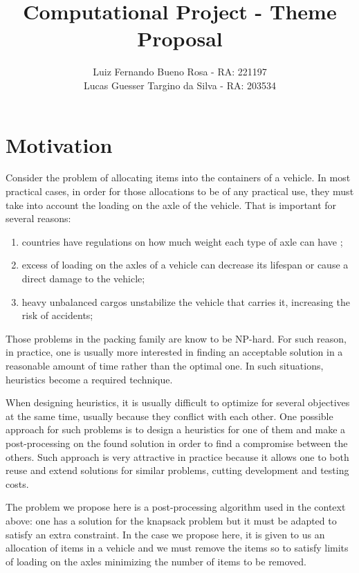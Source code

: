 \documentclass{article}
\title{Computational Project - Theme Proposal}
\author{
	Luiz Fernando Bueno Rosa - RA: 221197 \\
	Lucas Guesser Targino da Silva - RA: 203534
}
\newcommand{\nphard}{NP-hard\xspace}
\begin{document}
\maketitle

\section{Motivation}

Consider the problem of allocating items into the containers of a vehicle. In most practical cases, in order for those allocations to be of any practical use, they must take into account the loading on the axle of the vehicle. That is important for several reasons:

\begin{enumerate}
	\item countries have regulations on how much weight each type of axle can have \cite{bib:law-loading-on-axles};
	\item excess of loading on the axles of a vehicle can decrease its lifespan or cause a direct damage to the vehicle;
	\item heavy unbalanced cargos unstabilize the vehicle that carries it, increasing the risk of accidents;
\end{enumerate} 

Those problems in the packing family are know to be \nphard \cite{bib:knapsack-problems}. For such reason, in practice, one is usually more interested in finding an acceptable solution in a reasonable amount of time rather than the optimal one. In such situations, heuristics become a required technique.

When designing heuristics, it is usually difficult to optimize for several objectives at the same time, usually because they conflict with each other. One possible approach for such problems is to design a heuristics for one of them and make a post-processing on the found solution in order to find a compromise between the others. Such approach is very attractive in practice because it allows one to both reuse and extend solutions for similar problems, cutting development and testing costs.

The problem we propose here is a post-processing algorithm used in the context above: one has a solution for the knapsack problem but it must be adapted to satisfy an extra constraint. In the case we propose here, it is given to us an allocation of items in a vehicle and we must remove the items so to satisfy limits of loading on the axles minimizing the number of items to be removed.
\end{document}
